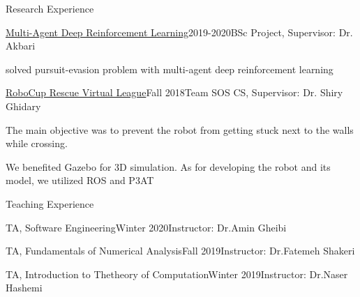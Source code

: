 \documentclass{resume} %
\begin{document}
	\begin{rSection}{Research Experience}
		
			\begin{rSubsection}{\href{https://github.com/mina-parham/multi-agentDRL}{\textcolor{coolblack}{Multi-Agent Deep Reinforcement Learning}}}{2019-2020}{BSc Project, Supervisor: Dr. Akbari}{ }
		\item solved pursuit-evasion problem with multi-agent deep reinforcement learning
	\end{rSubsection}
		\begin{rSubsection}{\href{https://github.com/mina-parham/mina-parham.github.io/raw/master/images/portfolio/liberty.jpg}{\textcolor{coolblack}{RoboCup Rescue Virtual League}}}{Fall 2018}{Team SOS CS, Supervisor: Dr. Shiry Ghidary}{ }
			\item The main objective was to prevent the robot from getting stuck next to the walls while crossing. 
			\item We benefited Gazebo for 3D simulation. As for developing the robot and its model, we utilized ROS and P3AT  
		
	\end{rSubsection}
	\end{rSection}
	\begin{rSection}{Teaching Experience}
		\begin{rSubsection}{TA, Software Engineering}{Winter 2020}{Instructor: Dr.Amin Gheibi}{ }
		\end{rSubsection}				
		\begin{rSubsection}{TA, Fundamentals of Numerical Analysis}{Fall 2019}{Instructor: Dr.Fatemeh Shakeri}{ }
		\end{rSubsection}					%
		\begin{rSubsection}{TA, Introduction to Thetheory of Computation}{Winter 2019}{Instructor: Dr.Naser Hashemi}{ }
		\end{rSubsection}					%
	
		
		
	\end{rSection}
\end{document}
